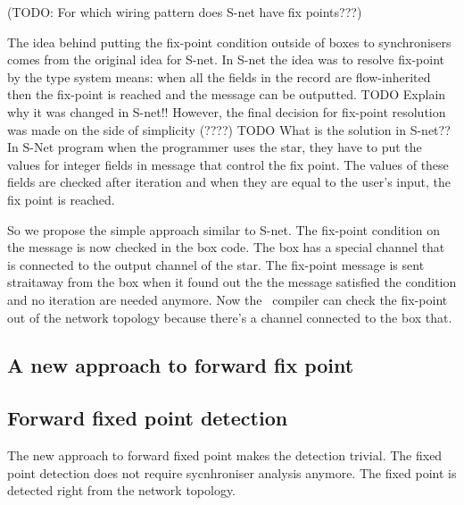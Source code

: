 (TODO: For which wiring pattern does S-net have fix points???)

The idea behind putting the fix-point condition outside of boxes to synchronisers comes from the original idea for S-net. In S-net the idea was to resolve fix-point by the type system means: when all the fields in the record are flow-inherited then the fix-point is reached and the message can be outputted. TODO Explain why it was changed in S-net!! However, the final decision for fix-point resolution was made on the side of simplicity (????) TODO What is the solution in S-net??
In S-Net program when the programmer uses the star, they have to put the values for integer fields in message that control the fix point. The values of these fields are checked after iteration and when they are equal to the user's input, the fix point is reached.

So we propose the simple approach similar to S-net. The fix-point condition on the message is now checked in the box code. The box has a special channel that is connected to the output channel of the star. The fix-point message is sent straitaway from the box when it found out the the message satisfied the condition and no iteration are needed anymore. Now the \ak\ compiler can check the fix-point out of the network topology because there's a channel connected to the box that.


    \subsection{A new approach to forward fix point}
%

    \subsection{Forward fixed point detection}
The new approach to forward fixed point makes the detection trivial. The fixed point detection does not require sycnhroniser analysis anymore. The fixed point is detected right from the network topology.



